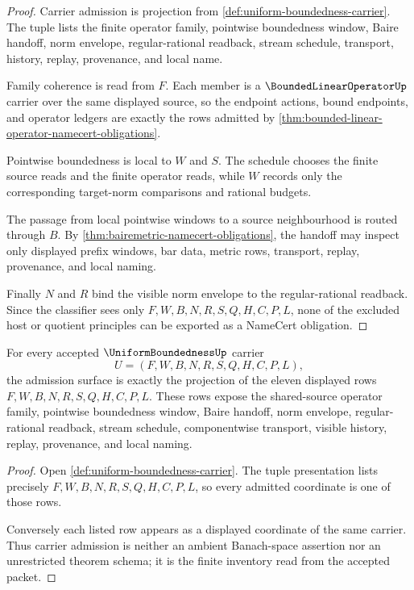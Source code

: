\begin{proof}
Carrier admission is projection from \autoref{def:uniform-boundedness-carrier}. The tuple lists the finite operator family, pointwise boundedness window, Baire handoff, norm envelope, regular-rational readback, stream schedule, transport, history, replay, provenance, and local name.

Family coherence is read from $F$. Each member is a $\BoundedLinearOperatorUp$ carrier over the same displayed source, so the endpoint actions, bound endpoints, and operator ledgers are exactly the rows admitted by \autoref{thm:bounded-linear-operator-namecert-obligations}.

Pointwise boundedness is local to $W$ and $S$. The schedule chooses the finite source reads and the finite operator reads, while $W$ records only the corresponding target-norm comparisons and rational budgets.

The passage from local pointwise windows to a source neighbourhood is routed through $B$. By \autoref{thm:bairemetric-namecert-obligations}, the handoff may inspect only displayed prefix windows, bar data, metric rows, transport, replay, provenance, and local naming.

Finally $N$ and $R$ bind the visible norm envelope to the regular-rational readback. Since the classifier sees only $F,W,B,N,R,S,Q,H,C,P,L$, none of the excluded host or quotient principles can be exported as a NameCert obligation.
\end{proof}

\begin{theorem}
\label{thm:uniform-boundedness-carrier-admission}
For every accepted $\UniformBoundednessUp$ carrier
$$
U=(F,W,B,N,R,S,Q,H,C,P,L),
$$
the admission surface is exactly the projection of the eleven displayed rows $F,W,B,N,R,S,Q,H,C,P,L$. These rows expose the shared-source operator family, pointwise boundedness window, Baire handoff, norm envelope, regular-rational readback, stream schedule, componentwise transport, visible history, replay, provenance, and local naming.
\end{theorem}
\begin{proof}
Open \autoref{def:uniform-boundedness-carrier}. The tuple presentation lists precisely $F,W,B,N,R,S,Q,H,C,P,L$, so every admitted coordinate is one of those rows.

Conversely each listed row appears as a displayed coordinate of the same carrier. Thus carrier admission is neither an ambient Banach-space assertion nor an unrestricted theorem schema; it is the finite inventory read from the accepted packet.
\end{proof}


